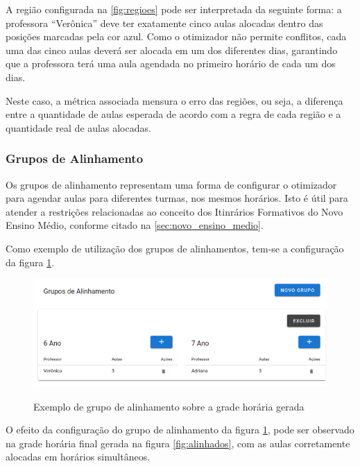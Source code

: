 A região configurada na \ref{fig:regioes} pode ser interpretada da seguinte forma: a professora ``Verônica'' deve ter exatamente cinco aulas alocadas dentro das posições marcadas pela cor azul. Como o otimizador não permite conflitos, cada uma das cinco aulas deverá ser alocada em um dos diferentes dias, garantindo que a professora terá uma aula agendada no primeiro horário de cada um dos dias.

Neste caso, a métrica associada mensura o erro das regiões, ou seja, a diferença entre a quantidade de aulas esperada de acordo com a regra de cada região e a quantidade real de aulas alocadas.

\subsubsection{Grupos de Alinhamento}

Os grupos de alinhamento representam uma forma de configurar o otimizador para agendar aulas para diferentes turmas, nos mesmos horários. Isto é útil para atender a restrições relacionadas ao conceito dos Itinrários Formativos do Novo Ensino Médio, conforme citado na \autoref{sec:novo_ensino_medio}.

Como exemplo de utilização dos grupos de alinhamentos, tem-se a configuração da figura \ref{fig:gruposAlinhamento}.

\begin{figure}[!htb]
	\centering
	\caption{Exemplo de grupo de alinhamento sobre a grade horária gerada}
	\includegraphics[width=1\textwidth]{./dados/figuras/gruposAlinhamento}
	\label{fig:gruposAlinhamento}
\end{figure}
\pagebreak

O efeito da configuração do grupo de alinhamento da figura \ref{fig:gruposAlinhamento}, pode ser observado na grade horária final gerada na figura \ref{fig:alinhados}, com as aulas corretamente alocadas em horários simultâneos.

